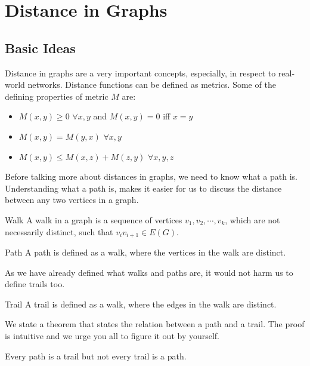 \documentclass[../basic_graph_theory.tex]{subfiles}
\begin{document}
\chapter{Distance in Graphs}
\setcounter{chapter}{2} %
\setcounter{section}{0}
\setcounter{equation}{0}
\setcounter{figure}{0}

\section{Basic Ideas}
Distance in graphs are a very important concepts, especially, in respect to real-world networks. Distance functions can be defined as metrics. Some of the defining properties of metric $M$ are:
\begin{itemize}
    \item $M(x,y) \ge 0$ $\forall x,y$ and $M(x,y)=0$ iff $x=y$
    \item $M(x,y)=M(y,x)$ $\forall x,y$
    \item $M(x,y) \le M(x,z)+M(z,y)$ $\forall x,y,z$
\end{itemize}

Before talking more about distances in graphs, we need to know what a path is. Understanding what a path is, makes it easier for us to discuss the distance between any two vertices in a graph.

\begin{Def}{Walk}{}
    A walk in a graph is a sequence of vertices $v_1, v_2,\cdots, v_k$, which are not necessarily distinct, such that $v_iv_{i+1} \in E(G)$.
\end{Def}

\begin{Def}{Path}{}
    A path is defined as a walk, where the vertices in the walk are distinct.
\end{Def}

As we have already defined what walks and paths are, it would not harm us to define trails too.

\begin{Def}{Trail}{}
    A trail is defined as a walk, where the edges in the walk are distinct.
\end{Def}

We state a theorem that states the relation between a path and a trail. The proof is intuitive and we urge you all to figure it out by yourself.

\begin{Thm}{}{}
    Every path is a trail but not every trail is a path.
\end{Thm}{}{}
\end{document}
